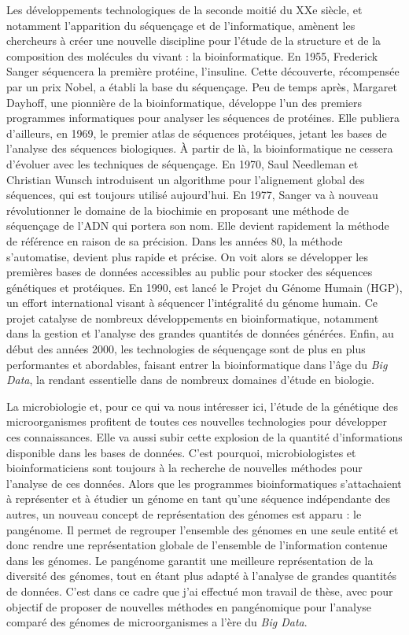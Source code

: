 Les développements technologiques de la seconde moitié du XXe siècle, et notamment l'apparition du séquençage et de l'informatique, amènent les chercheurs à créer une nouvelle discipline pour l'étude de la structure et de la composition des molécules du vivant : la bioinformatique. En 1955, Frederick Sanger séquencera la première protéine, l'insuline. Cette découverte, récompensée par un prix Nobel, a établi la base du séquençage. Peu de temps après, Margaret Dayhoff, une pionnière de la bioinformatique, développe l'un des premiers programmes informatiques pour analyser les séquences de protéines. Elle publiera d'ailleurs, en 1969, le premier atlas de séquences protéiques, jetant les bases de l'analyse des séquences biologiques. À partir de là, la bioinformatique ne cessera d'évoluer avec les techniques de séquençage. En 1970, Saul Needleman et Christian Wunsch introduisent un algorithme pour l'alignement global des séquences, qui est toujours utilisé aujourd'hui. En 1977, Sanger va à nouveau révolutionner le domaine de la biochimie en proposant une méthode de séquençage de l'ADN qui portera son nom. Elle devient rapidement la méthode de référence en raison de sa précision. Dans les années 80, la méthode s'automatise, devient plus rapide et précise. On voit alors se développer les premières bases de données accessibles au public pour stocker des séquences génétiques et protéiques. En 1990, est lancé le Projet du Génome Humain (HGP), un effort international visant à séquencer l'intégralité du génome humain. Ce projet catalyse de nombreux développements en bioinformatique, notamment dans la gestion et l'analyse des grandes quantités de données générées. Enfin, au début des années 2000, les technologies de séquençage sont de plus en plus performantes et abordables, faisant entrer la bioinformatique dans l'âge du \textit{Big Data}, la rendant essentielle dans de nombreux domaines d'étude en biologie.


La microbiologie et, pour ce qui va nous intéresser ici, l'étude de la génétique des microorganismes profitent de toutes ces nouvelles technologies pour développer ces connaissances. Elle va aussi subir cette explosion de la quantité d'informations disponible dans les bases de données. C'est pourquoi, microbiologistes et bioinformaticiens sont toujours à la recherche de nouvelles méthodes pour l'analyse de ces données. Alors que les programmes bioinformatiques s'attachaient à représenter et à étudier un génome en tant qu'une séquence indépendante des autres, un nouveau concept de représentation des génomes est apparu : le pangénome. Il permet de regrouper l'ensemble des génomes en une seule entité et donc rendre une représentation globale de l'ensemble de l'information contenue dans les génomes. Le pangénome garantit une meilleure représentation de la diversité des génomes, tout en étant plus adapté à l'analyse de grandes quantités de données. C'est dans ce cadre que j'ai effectué mon travail de thèse, avec pour objectif de proposer de nouvelles méthodes en pangénomique pour l'analyse comparé des génomes de microorganismes a l'ère du \textit{Big Data}.

